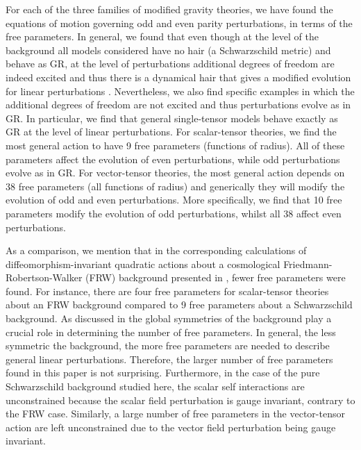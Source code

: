 \documentclass[10pt,twocolumn,preprintnumbers,amsmath,amssymb,nofootinbib
,superscriptaddress]{revtex4-1}
\begin{document}
{{{For each of the three families of modified gravity theories, we have found the equations of motion governing odd and even parity perturbations, in terms of the free parameters. In general, we found that even though at the level of the background all models considered have no hair (a Schwarzschild metric) and behave as GR, at the level of perturbations additional degrees of freedom are indeed excited and thus there is a dynamical hair that gives a modified evolution for linear perturbations \cite{Barausse:2008xv}. Nevertheless, we also find specific examples in which the additional degrees of freedom are not excited and thus perturbations evolve as in GR. In particular, we find that general single-tensor models behave exactly as GR at the level of linear perturbations. For scalar-tensor theories, we find the most general action to have 9 free parameters (functions of radius). All of these parameters affect the evolution of even perturbations, while odd perturbations evolve as in GR. For vector-tensor theories, the most general action depends on 38 free parameters (all functions of radius) and generically they will modify the evolution of odd and even perturbations. More specifically, we find that 10 free parameters modify the evolution of odd perturbations, whilst all 38 affect even perturbations. 

As a comparison, we mention that in the corresponding calculations of diffeomorphism-invariant quadratic actions about a cosmological Friedmann-Robertson-Walker (FRW) background presented in \cite{Tattersall:2017eav,Lagos:2016wyv}, fewer free parameters were found. For instance, there are four free parameters for scalar-tensor theories about an FRW background compared to 9 free parameters about a Schwarzschild background. As discussed in \cite{Tattersall:2017eav} the global symmetries of the background play a crucial role in determining the number of free parameters. In general, the less symmetric the background, the more free parameters are needed to describe general linear perturbations. Therefore, the larger number of free parameters found in this paper is not surprising. Furthermore, in the case of the pure Schwarzschild background studied here, the scalar self interactions are unconstrained because the scalar field perturbation is gauge invariant, contrary to the FRW case. Similarly, a large number of free parameters in the vector-tensor action are left unconstrained due to the vector field perturbation being gauge invariant.

}}}
\end{document}
